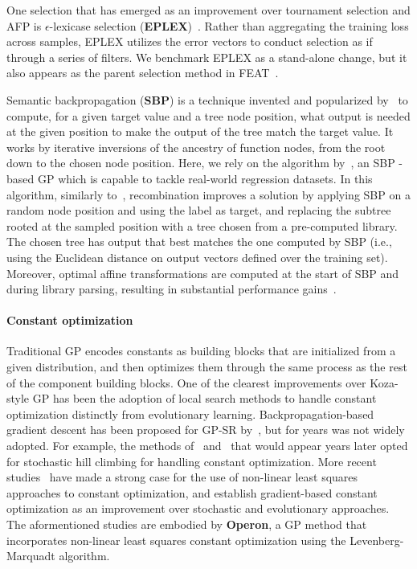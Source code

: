 One selection that has emerged as an improvement over tournament selection and AFP is $\epsilon$-lexicase selection (\textbf{EPLEX})~\cite{lacavaEpsilonLexicaseSelectionRegression2016c}. 
Rather than aggregating the training loss across samples, EPLEX utilizes the error vectors to conduct selection as if through a series of filters. 
We benchmark EPLEX as a stand-alone change, but it also appears as the parent selection method in FEAT~\cite{lacavaLearningConciseRepresentations2019c}. 

Semantic backpropagation (\textbf{SBP}) is a technique invented and popularized by~\cite{wieloch2013running,krawiec2013approximating,pawlak2014semantic} to compute, for a given target value and a tree node position, what output is needed at the given position to make the output of the tree match the target value. 
It works by iterative inversions of the ancestry of function nodes, from the root down to the chosen node position. 
Here, we rely on the algorithm by~\citet{virgolinLinearScalingSemantic2019}, an SBP -based GP which is capable to tackle real-world regression datasets. 
In this algorithm, similarly to~\cite{wieloch2013running}, recombination improves a solution by applying SBP on a random node position and using the label as target, and replacing the subtree rooted at the sampled position with a tree chosen from a pre-computed library. 
The chosen tree has output that best matches the one computed by SBP (i.e., using the Euclidean distance on output vectors defined over the training set). 
Moreover, optimal affine transformations are computed at the start of SBP and during library parsing, resulting in substantial performance gains~\cite{virgolinLinearScalingSemantic2019}.

\paragraph{Constant optimization}

Traditional GP encodes constants as building blocks that are initialized from a given distribution, and then optimizes them through the same process as the rest of the component building blocks.
One of the clearest improvements over Koza-style GP has been the adoption of local search methods to handle constant optimization distinctly from evolutionary learning. 
Backpropagation-based gradient descent has been proposed for GP-SR by~\citet{topchyFasterGeneticProgramming2001}, but for years was not widely adopted. 
For example, the methods of~\citet{bongardNonlinearSystemIdentification2005a} and~\citet{schmidtDistillingFreeformNatural2009} that would appear years later opted for stochastic hill climbing for handling constant optimization. 
More recent studies~\cite{kommenda_effects_2013,kommendaParameterIdentificationSymbolic2019} have made a strong case for the use of non-linear least squares approaches to constant optimization, and establish gradient-based constant optimization as an improvement over stochastic and evolutionary approaches.
The aformentioned studies are embodied by \textbf{Operon}, a GP method that incorporates non-linear least squares constant optimization using the Levenberg-Marquadt algorithm\cite{burlacuOperonEfficientGenetic2020}.


